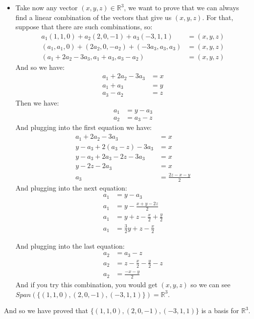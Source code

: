 \documentclass[final,expand]{problemset}
\begin{document}
{\begin{itemize}
		\item Take now any vector $(x, y, z) \in \mathbb{R}^3$, we want to prove that we can always find a linear combination of the vectors that give us $(x, y, z)$. For that, suppose that there are such combinations, so:
		\begin{align*}
			a_1(1, 1, 0) + a_2(2, 0, -1) + a_3(-3, 1, 1) &= (x, y, z)\\
			(a_1, a_1, 0) + (2a_2, 0, -a_2) + (-3a_3, a_3, a_3) &= (x, y, z)\\
			(a_1 + 2a_2 - 3a_3, a_1 + a_3, a_3 - a_2) &= (x, y, z)
		\end{align*}
		And so we have:
		\begin{align*}
			a_1 + 2a_2 - 3a_3 &= x\\
			a_1 + a_3 &= y\\
			a_3 - a_2 &= z
		\end{align*}
		Then we have:
		\begin{align*}
			a_1 &= y-a_3\\
			a_2 &= a_3 - z
		\end{align*}
		And plugging into the first equation we have:
		\begin{align*}
			a_1 + 2a_2 - 3a_3 &= x\\
			y-a_3 + 2(a_3 - z) - 3a_3 &= x\\
			y-a_3 + 2a_3 - 2z - 3a_3 &= x\\
			y - 2z - 2a_3 &= x\\
			a_3 &= \frac{2z - x- y}{2}
		\end{align*}
		And plugging into the next equation:
		\begin{align*}
			a_1 &= y - a_3\\
			a_1 &= y - \frac{x+y-2z}{2}\\
			a_1 &= y + z - \frac{x}{2} + \frac{y}{2}\\
			a_1 &= \frac{3}{2} y + z - \frac{x}{2}
		\end{align*}

		And plugging into the last equation:
		\begin{align*}
			a_2 &= a_3 - z\\
			a_2 &= z - \frac{x}{2} - \frac{y}{2} - z\\
			a_2 &= \frac{-x-y}{2}
		\end{align*}
		And if you try this combination, you would get $(x, y, z)$ so we can see $Span(\{(1, 1, 0), (2, 0, -1), (-3, 1, 1)\}) = \mathbb{R}^3$.
	\end{itemize}

	And so we have proved that $\{(1, 1, 0), (2, 0, -1), (-3, 1, 1)\}$ is a basis for $\mathbb{R}^3$.
}
\end{document}
